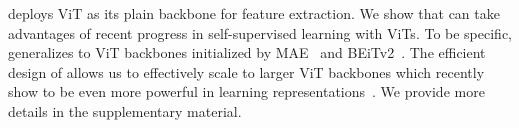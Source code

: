  \ours deploys ViT as its plain backbone for feature extraction. We show that \ours can take advantages of recent progress in self-supervised learning with ViTs. To be specific, \ours generalizes to ViT backbones initialized by MAE~\cite{he2022mae} and BEiTv2~\cite{peng2022beitv2}. The efficient design of \ours allows us to effectively scale to larger ViT backbones which recently show to be even more powerful in learning representations~\cite{he2022mae,zhai2022scalingvit,dehghani2023scalingvit22b}. We provide more details in the supplementary material.
